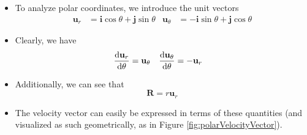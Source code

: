 \documentclass[../main.tex]{subfiles}
\begin{document}
\begin{itemize}
    \item To analyze polar coordinates, we introduce the unit vectors
    \begin{align*}
        \textbf{u}_r &= \textbf{i}\cos\theta+\textbf{j}\sin\theta&
            \textbf{u}_\theta &= -\textbf{i}\sin\theta+\textbf{j}\cos\theta
    \end{align*}
    \item Clearly, we have
    \begin{align*}
        \dv{\textbf{u}_r}{\theta} &= \textbf{u}_\theta&
            \dv{\textbf{u}_\theta}{\theta} &= -\textbf{u}_r
    \end{align*}
    \item Additionally, we can see that
    \begin{equation*}
        \textbf{R} = r\textbf{u}_r
    \end{equation*}
    \item The velocity vector can easily be expressed in terms of these quantities (and visualized as such geometrically, as in Figure \ref{fig:polarVelocityVector}).
    \begin{figure}[h!]
        \centering
\end{figure}
\end{itemize}
\end{document}
